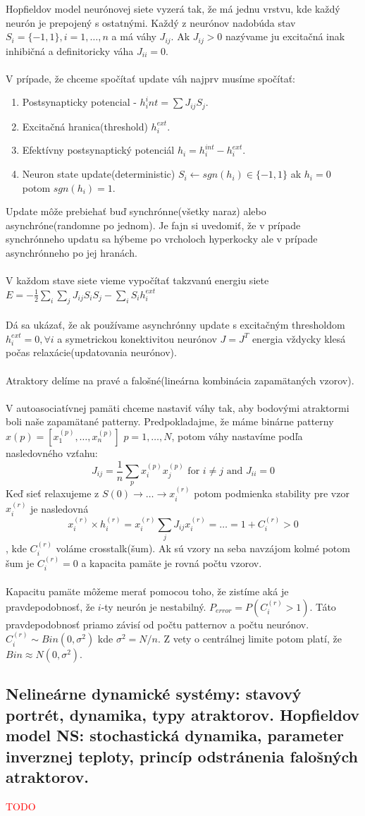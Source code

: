 \documentclass{article}
\numberwithin{equation}{section} %
\begin{document}
Hopfieldov model neurónovej siete vyzerá tak, že má jednu vrstvu, kde každý neurón je prepojený s ostatnými. Každý z neurónov nadobúda stav $S_i = \{-1,1\}, i = 1,\dots, n$ a má váhy $J_{ij}$. Ak $J_{ij} > 0$ nazývame ju excitačná inak inhibičná a definitoricky váha $J_{ii} = 0$. \\\\
V prípade, že chceme spočítať update váh najprv musíme spočítať:
\begin{enumerate}
\item Postsynapticky potencial - $h_i^int = \sum J_{ij}S_j$.
\item Excitačná hranica(threshold) $h_i^{ext}$.
\item Efektívny postsynaptický potenciál $h_i = h_i^{int} - h_i^{ext}$.
\item Neuron state update(deterministic) $S_i \leftarrow sgn(h_i) \in \{-1,1\}$ ak $h_i=0$ potom $sgn(h_i) = 1$.
\end{enumerate}
Update môže prebiehať buď synchrónne(všetky naraz) alebo asynchróne(randomne po jednom). Je fajn si uvedomiť, že v prípade synchrónneho updatu sa hýbeme po vrcholoch hyperkocky ale v prípade asynchrónneho po jej hranách.
\\\\
 V každom stave siete vieme vypočítať takzvanú energiu siete $E = -\frac{1}{2}\sum_i\sum_jJ_{ij}S_iS_j - \sum_iS_ih_i^{ext}$
\\\\
Dá sa ukázať, že ak používame asynchrónny update s excitačným thresholdom $h_i^{ext} = 0, \forall i$ a symetrickou konektivitou neurónov $J = J^T$ energia vždycky klesá počas relaxácie(updatovania neurónov). 
\\\\
Atraktory delíme na pravé a falošné(lineárna kombinácia zapamätaných vzorov). 
\\\\
V autoasociatívnej pamäti chceme nastaviť váhy tak, aby bodovými atraktormi boli naše zapamätané patterny.
Predpokladajme, že máme binárne patterny $x{(p)} = [x_1^{(p)}, \dots, x_n^{(p)}]$ $p = 1, \dots, N$, potom váhy nastavíme podľa nasledovného vzťahu: 
$$ J_{ij} = \frac{1}{n}\sum_p x_i^{(p)} x_j^{(p)} \text{ for } i\neq j \text{ and } J_{ii} = 0$$
Keď sieť relaxujeme z $S(0) \to \dots \to x_i^{(r)}$ potom podmienka stability  pre vzor $x_i^{(r)}$ je nasledovná 
$$x_i^{(r)}\times h_i^{(r)} = x_i^{(r)}\sum_jJ_{ij}x_i^{(r)} = \dots = 1 + C_i^{(r)} > 0$$, 
kde $C_i^{(r)}$ voláme crosstalk(šum). Ak sú vzory na seba navzájom kolmé potom šum je $C_i^{(r)} = 0$ a kapacita pamäte je rovná počtu vzorov.
\\\\
Kapacitu pamäte môžeme merať pomocou toho, že zistíme aká je pravdepodobnosť, že $i$-ty neurón je nestabilný. $P_{error} = P(C_i^{(r)} > 1)$. Táto pravdepodobnosť priamo závisí od počtu patternov a počtu neurónov. $C_i^{(r)} \sim Bin(0,\sigma^2)$ kde $\sigma^2 = N/n$. Z vety o centrálnej limite potom platí, že $Bin\approx N(0, \sigma^2)$.


\subsection{Nelineárne dynamické systémy: stavový portrét, dynamika, typy atraktorov. Hopfieldov model NS: stochastická dynamika, parameter inverznej teploty, princíp odstránenia falošných atraktorov.}
\textcolor{red}{TODO}
\end{document}
